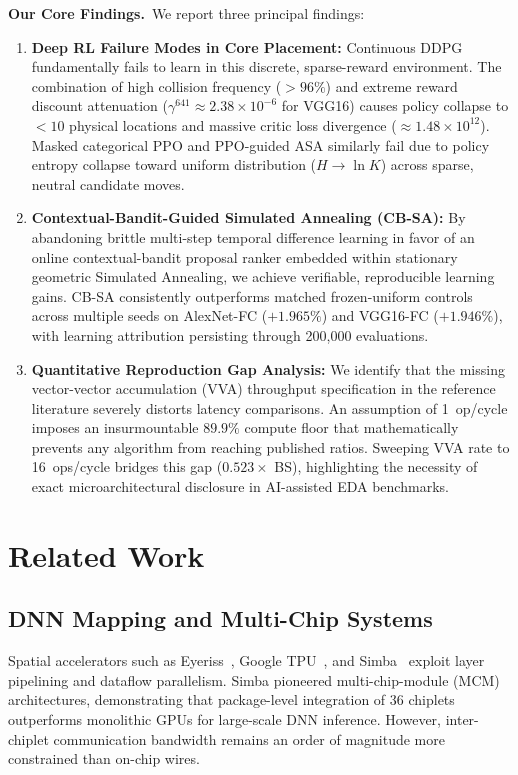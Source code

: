 \documentclass[10pt,conference]{IEEEtran}
\begin{document}
\textbf{Our Core Findings.}\ We report three principal findings:
\begin{enumerate}
  \item \textbf{Deep RL Failure Modes in Core Placement:} Continuous DDPG fundamentally fails to learn in this discrete, sparse-reward environment. The combination of high collision frequency ($>96\%$) and extreme reward discount attenuation ($\gamma^{641} \approx 2.38 \times 10^{-6}$ for VGG16) causes policy collapse to $<10$ physical locations and massive critic loss divergence ($\approx 1.48 \times 10^{12}$). Masked categorical PPO and PPO-guided ASA similarly fail due to policy entropy collapse toward uniform distribution ($H \to \ln K$) across sparse, neutral candidate moves.
  \item \textbf{Contextual-Bandit-Guided Simulated Annealing (CB-SA):} By abandoning brittle multi-step temporal difference learning in favor of an online contextual-bandit proposal ranker embedded within stationary geometric Simulated Annealing, we achieve verifiable, reproducible learning gains. CB-SA consistently outperforms matched frozen-uniform controls across multiple seeds on AlexNet-FC ($+1.965\%$) and VGG16-FC ($+1.946\%$), with learning attribution persisting through 200,000 evaluations.
  \item \textbf{Quantitative Reproduction Gap Analysis:} We identify that the missing vector-vector accumulation (VVA) throughput specification in the reference literature severely distorts latency comparisons. An assumption of 1~op/cycle imposes an insurmountable $89.9\%$ compute floor that mathematically prevents any algorithm from reaching published ratios. Sweeping VVA rate to 16~ops/cycle bridges this gap ($0.523 \times$ BS), highlighting the necessity of exact microarchitectural disclosure in AI-assisted EDA benchmarks.
\end{enumerate}

\section{Related Work}
\label{sec:related}

\subsection{DNN Mapping and Multi-Chip Systems}
Spatial accelerators such as Eyeriss~\cite{chen2016eyeriss}, Google TPU~\cite{jouppi2017tpu}, and Simba~\cite{shao2019simba} exploit layer pipelining and dataflow parallelism. Simba pioneered multi-chip-module (MCM) architectures, demonstrating that package-level integration of 36 chiplets outperforms monolithic GPUs for large-scale DNN inference. However, inter-chiplet communication bandwidth remains an order of magnitude more constrained than on-chip wires. 
\end{document}
